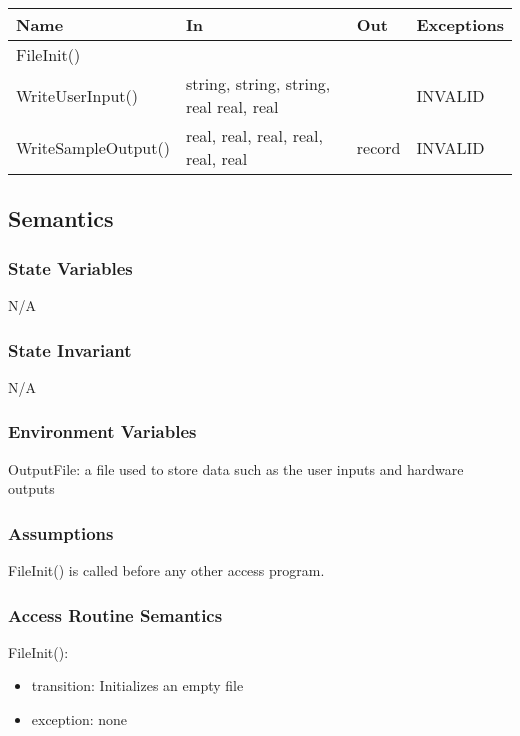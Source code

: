 \documentclass[12pt, titlepage]{article}
\begin{document}
\begin{center}
\begin{tabular}{p{4cm} p{6cm} p{2cm} p{3cm}}
\hline
\textbf{Name} & \textbf{In} & \textbf{Out} & \textbf{Exceptions} \\
\hline
FileInit() & &  &  \\
WriteUserInput() & string, string, string, real real, real&  & INVALID \\
WriteSampleOutput()& real, real, real, real, real, real & record & INVALID \\

\hline
\end{tabular}
\end{center}

\subsection{Semantics}

\subsubsection{State Variables}

N/A
\subsubsection{State Invariant}

N/A
\subsubsection{Environment Variables}

OutputFile: a file used to store data such as the user inputs and hardware outputs

\subsubsection{Assumptions}

FileInit() is called before any other access program. 

\subsubsection{Access Routine Semantics}

\noindent FileInit():
\begin{itemize}
\item transition: Initializes an empty file
\item exception: none
\end{itemize}
\end{document}
